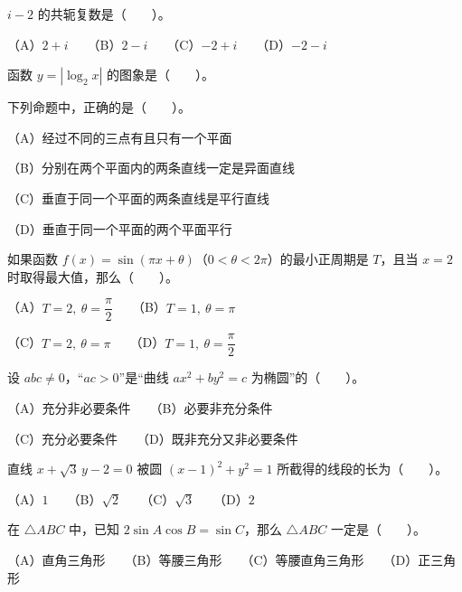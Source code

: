 \begin{question}
$i-2$ 的共轭复数是\mbox{（　　）}。

（A）$2+i$　　（B）$2-i$　　（C）$-2+i$　　（D）$-2-i$

\Needspace{0.4\textheight}
\end{question}
\begin{question}
函数 $y=|\log_2 x|$ 的图象是\mbox{（　　）}。
\nopagebreak[4]
\begin{center}\end{center}
\nopagebreak[4]
\end{question}
\begin{question}
下列命题中，正确的是\mbox{（　　）}。

（A）经过不同的三点有且只有一个平面

（B）分别在两个平面内的两条直线一定是异面直线

（C）垂直于同一个平面的两条直线是平行直线

（D）垂直于同一个平面的两个平面平行

\end{question}
\begin{question}
如果函数 $f(x)=\sin(\pi x+\theta)$（$0<\theta<2\pi$）的最小正周期是 $T$，且当 $x=2$ 时取得最大值，那么\mbox{（　　）}。

（A）$T=2,\ \theta=\dfrac{\pi}{2}$　　（B）$T=1,\ \theta=\pi$

（C）$T=2,\ \theta=\pi$　　（D）$T=1,\ \theta=\dfrac{\pi}{2}$

\end{question}
\begin{question}
设 $abc\ne0$，“$ac>0$”是“曲线 $ax^2+by^2=c$ 为椭圆”的\mbox{（　　）}。

（A）充分非必要条件　　（B）必要非充分条件

（C）充分必要条件　　（D）既非充分又非必要条件

\end{question}
\begin{question}
直线 $x+\sqrt{3}\,y-2=0$ 被圆 $(x-1)^2+y^2=1$ 所截得的线段的长为\mbox{（　　）}。

（A）$1$　　（B）$\sqrt{2}$　　（C）$\sqrt{3}$　　（D）$2$

\end{question}
\begin{question}
在 $\triangle ABC$ 中，已知 $2\sin A\cos B=\sin C$，那么 $\triangle ABC$ 一定是\mbox{（　　）}。

（A）直角三角形　　（B）等腰三角形　　（C）等腰直角三角形　　（D）正三角形

\end{question}
